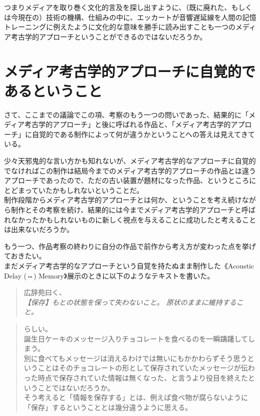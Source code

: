 \documentclass[a4paper,report]{jsbook}
\begin{document}
つまりメディアを取り巻く文化的言及を探し出すように、（既に廃れた、もしくは今現在の）技術の機構、仕組みの中に、エッカートが音響遅延線を人間の記憶トレーニングに例えたように文化的な意味を勝手に読み出すことも一つのメディア考古学的アプローチということができるのではないだろうか。

\section{メディア考古学的アプローチに自覚的であるということ}\label{ux30e1ux30c7ux30a3ux30a2ux8003ux53e4ux5b66ux7684ux30a2ux30d7ux30edux30fcux30c1ux306bux81eaux899aux7684ux3067ux3042ux308bux3068ux3044ux3046ux3053ux3068}

さて、ここまでの議論でこの項、考察のもう一つの問いであった、結果的に「メディア考古学的アプローチ」と後に呼ばれる作品と、「メディア考古学的アプローチ」に自覚的である制作によって何が違うかということへの答えは見えてきている。

少々天邪鬼的な言い方かも知れないが、メディア考古学的なアプローチに自覚的でなければこの制作は結局今までのメディア考古学的アプローチの作品とは違うアプローチであったので、ただの古い装置が題材になった作品、というところにとどまっていたかもしれないということだ。\\
制作段階からメディア考古学的アプローチとは何か、ということを考え続けながら制作とその考察を続け、結果的には今までメディア考古学的アプローチと呼ばれなかったかもしれないものに新しく視点を与えることに成功したと考えることは出来ないだろうか。

もう一つ、作品考察の終わりに自分の作品で前作から考え方が変わった点を挙げておきたい。\\
まだメディア考古学的なアプローチという自覚を持たぬまま制作した《Acoustic
Delay (⇔) Memory》展示のときに以下のようなテキストを書いた。

\begin{quote}
広辞苑曰く、\\
\emph{【保存】もとの状態を保って失わないこと。
原状のままに維持すること。}
\end{quote}

\begin{quote}
らしい。\\
誕生日ケーキのメッセージ入りチョコレートを食べるのを一瞬躊躇してしまう。\\
別に食べてもメッセージは消えるわけでは無いにもかかわらずそう思うということはそのチョコレートの形として保存されていたメッセージが伝わった時点で保存されていた情報は無くなった、と言うより役目を終えたということではないだろうか。\\
そう考えると「情報を保存する」とは、例えば食べ物が腐らないように「保存」するということとは幾分違うように思える。
\end{quote}
\end{document}
